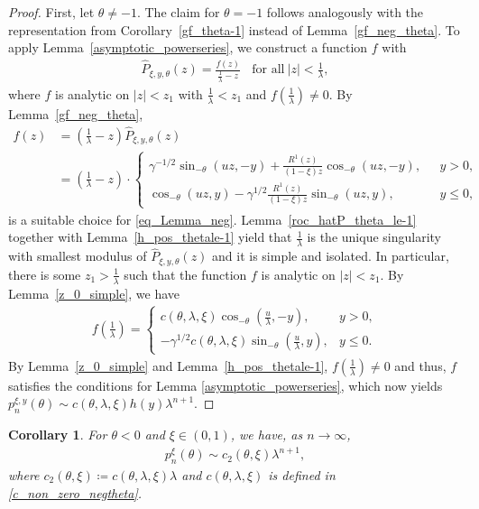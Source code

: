 \documentclass[10pt,a4paper]{amsart}
\newcommand{\1}{\mathds{1}}
\newtheorem{Corollary}[definition]{Corollary}
\begin{document}
\begin{proof}
    First, let $\theta\neq -1$. The claim for $\theta=-1$ follows analogously with the representation from Corollary~\ref{gf_theta-1} instead of Lemma~\ref{gf_neg_theta}. To apply Lemma~\ref{asymptotic_powerseries}, we construct a function $f$ with
    \begin{align}
        \hat{P}_{\xi,y,\theta}(z)=\frac{f(z)}{\frac{1}{\lambda}-z}~~~~\text{for all}~|z|<\frac{1}{\lambda}\label{eq_Lemma_neg},
    \end{align}
   where $f$ is analytic on $|z|<z_1$ with $\frac{1}{\lambda}<z_1$ and $f\left(\frac{1}{\lambda}\right)\neq 0$. By Lemma~\ref{gf_neg_theta}, 
   \begin{align*}
        f(z)&=  \left(\frac{1}{\lambda}-z\right)\hat{P}_{\xi,y,\theta}(z)
        \\&=\left(\frac{1}{\lambda}-z\right)\cdot
      \begin{cases}
          \gamma^{-1/2}\sin_{-\theta}(uz,-y)+\frac{R^1(z)}{(1-\xi) z}\cos_{-\theta}(uz,-y),~~~&y>0,
          \\\cos_{-\theta}(uz,y)
     -\gamma^{1/2}\frac{R^1(z)}{(1-\xi) z}\sin_{-\theta}(uz,y),&y\le 0,
     \end{cases}
   \end{align*}
   is a suitable choice for \eqref{eq_Lemma_neg}. Lemma~\ref{roc_hatP_theta_le-1} together with Lemma~\ref{h_pos_thetale-1} yield that $\frac{1}{\lambda}$ is the unique singularity with smallest modulus of $\hat{P}_{\xi,y,\theta}(z)$ and it is simple and isolated. In particular, there is some $z_1>\frac{1}{\lambda}$ such that the function $f$ is analytic on $|z|<z_1$. By Lemma~\ref{z_0_simple}, we have
   \begin{align*}
       f\left(\frac{1}{\lambda}\right)=\begin{cases}
         c(\theta,\lambda,\xi)\cos_{-\theta}\left(\frac{u}{\lambda},-y\right),~~~&y>0,
          \\-\gamma^{1/2}c(\theta,\lambda,\xi)\sin_{-\theta}\left(\frac{u}{\lambda},y\right),&y\le 0.
     \end{cases}
   \end{align*}
 By Lemma~\ref{z_0_simple} and
  Lemma~\ref{h_pos_thetale-1}, $f\left(\frac{1}{\lambda}\right)\neq0$ and thus, $f$ satisfies the  conditions for Lemma \ref{asymptotic_powerseries}, which now yields $p_n^{\xi,y}(\theta)\sim c(\theta,\lambda,\xi)h(y)\lambda^{n+1}$.
\end{proof}
\begin{Corollary}\label{asymptotic_theta_neg_ohne_y}
      For $\theta<0$ and  $\xi\in(0,1)$, we have, as $n\to\infty$,
  \begin{align*}
       p_n^{\xi}(\theta)\sim c_2(\theta,\xi)\lambda^{n+1},
  \end{align*}
  where $c_2(\theta,\xi)\coloneqq c(\theta,\lambda,\xi)\lambda$ and $c(\theta,\lambda,\xi)$ is defined in \eqref{c_non_zero_negtheta}.
\end{Corollary}
\end{document}
